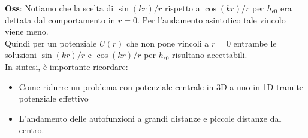 \documentclass[../../FisicaTeorica.tex]{subfiles}
\begin{document}
\textbf{Oss}: Notiamo che la scelta di $\sin(kr)/r$ rispetto a $\cos(kr)/r$ per $h_{\epsilon 0}$ era dettata dal comportamento in $r=0$. Per l'andamento asintotico tale vincolo viene meno.\\
Quindi per un potenziale $U(r)$ che non pone vincoli a $r=0$ entrambe le soluzioni $\sin(kr)/r$ e $\cos(kr)/r$ per $h_{\epsilon 0}$ risultano accettabili.\\

In sintesi, è importante ricordare:
\begin{itemize}
\item Come ridurre un problema con potenziale centrale in 3D a uno in 1D tramite potenziale effettivo
\item L'andamento delle autofunzioni a grandi distanze e piccole distanze dal centro.
\end{itemize}
\end{document}
